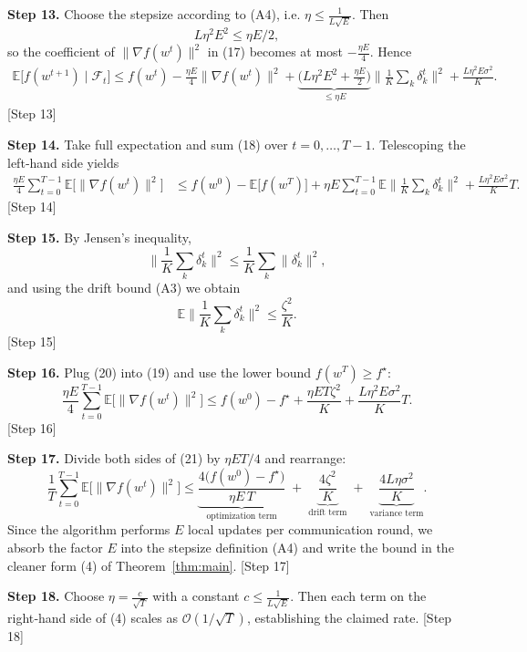 \documentclass{article}
\begin{document}
\noindent\textbf{Step 13.} Choose the stepsize according to (A4), i.e. \(\eta\le \frac{1}{L\sqrt{E}}\). Then
\[
L\eta^{2}E^{2}\le \eta E/2,
\] 
so the coefficient of \(\|\nabla f(w^{t})\|^{2}\) in (17) becomes at most \(-\frac{\eta E}{4}\). Hence
\[
\begin{aligned}
\mathbb{E}\!\big[f(w^{t+1})\mid\mathcal{F}_{t}\big]
\le f(w^{t})
   -\frac{\eta E}{4}\|\nabla f(w^{t})\|^{2}
   +\underbrace{\Big(L\eta^{2}E^{2}+\frac{\eta E}{2}\Big)}_{\le \eta E}\Big\|\frac1K\sum_{k}\delta_{k}^{t}\Big\|^{2}
   +\frac{L\eta^{2}E\sigma^{2}}{K}.
\end{aligned}
\tag{18}
\] \hfill [Step 13]

\noindent\textbf{Step 14.} Take full expectation and sum (18) over \(t=0,\dots ,T-1\). Telescoping the left‑hand side yields
\[
\begin{aligned}
\frac{\eta E}{4}\sum_{t=0}^{T-1}\mathbb{E}\!\big[\|\nabla f(w^{t})\|^{2}\big]
&\le f(w^{0})- \mathbb{E}\!\big[f(w^{T})\big]
   +\eta E\sum_{t=0}^{T-1}\mathbb{E}\!\Big\|\frac1K\sum_{k}\delta_{k}^{t}\Big\|^{2}
   +\frac{L\eta^{2}E\sigma^{2}}{K}T .
\end{aligned}
\tag{19}
\] \hfill [Step 14]

\noindent\textbf{Step 15.} By Jensen’s inequality,
\[
\Big\|\frac1K\sum_{k}\delta_{k}^{t}\Big\|^{2}
\le \frac1K\sum_{k}\|\delta_{k}^{t}\|^{2},
\] 
and using the drift bound (A3) we obtain
\[
\mathbb{E}\!\Big\|\frac1K\sum_{k}\delta_{k}^{t}\Big\|^{2}\le \frac{\zeta^{2}}{K}. \tag{20}
\] \hfill [Step 15]

\noindent\textbf{Step 16.} Plug (20) into (19) and use the lower bound \(f(w^{T})\ge f^{\star}\):
\[
\frac{\eta E}{4}\sum_{t=0}^{T-1}\mathbb{E}\!\big[\|\nabla f(w^{t})\|^{2}\big]
\le f(w^{0})-f^{\star}
   +\frac{\eta E T\zeta^{2}}{K}
   +\frac{L\eta^{2}E\sigma^{2}}{K}T .
\tag{21}
\] \hfill [Step 16]

\noindent\textbf{Step 17.} Divide both sides of (21) by \(\eta E T/4\) and rearrange:
\[
\frac1T\sum_{t=0}^{T-1}\mathbb{E}\!\big[\|\nabla f(w^{t})\|^{2}\big]
\le
\underbrace{\frac{4\big(f(w^{0})-f^{\star}\big)}{\eta E\,T}}_{\text{optimization term}}
\;+\;
\underbrace{\frac{4\zeta^{2}}{K}}_{\text{drift term}}
\;+\;
\underbrace{\frac{4L\eta\sigma^{2}}{K}}_{\text{variance term}} .
\] 
Since the algorithm performs \(E\) local updates per communication round, we absorb the factor \(E\) into the stepsize definition (A4) and write the bound in the cleaner form (4) of Theorem~\ref{thm:main}. \hfill [Step 17]

\noindent\textbf{Step 18.} Choose \(\eta = \frac{c}{\sqrt{T}}\) with a constant \(c\le \frac{1}{L\sqrt{E}}\). Then each term on the right‑hand side of (4) scales as \(\mathcal{O}(1/\sqrt{T})\), establishing the claimed rate. \hfill [Step 18]
\end{document}
